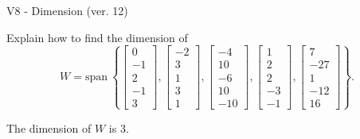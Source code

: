 \begin{exercise}
  \begin{exerciseTitle}V8 - Dimension (ver. 12)\end{exerciseTitle}
  \begin{exerciseStatement}
    Explain how to find the dimension of 
\[W=\mathrm{span}\ \left\{\left[\begin{array}{r}
0 \\
-1 \\
2 \\
-1 \\
3
\end{array}\right] , \left[\begin{array}{r}
-2 \\
3 \\
1 \\
3 \\
1
\end{array}\right] , \left[\begin{array}{r}
-4 \\
10 \\
-6 \\
10 \\
-10
\end{array}\right] , \left[\begin{array}{r}
1 \\
2 \\
2 \\
-3 \\
-1
\end{array}\right] , \left[\begin{array}{r}
7 \\
-27 \\
1 \\
-12 \\
16
\end{array}\right]\right\}.\]



  \end{exerciseStatement}
  \begin{exerciseAnswer}
   The dimension of \(W\) is  \(3\).
  


  \end{exerciseAnswer}
\end{exercise}
